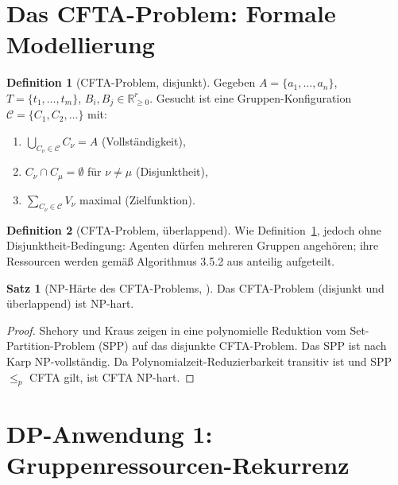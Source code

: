 \documentclass[a4paper,12pt]{article}
\theoremstyle{definition}
\newtheorem{definition}{Definition}
\newtheorem{satz}{Satz}
\begin{document}
\section{Das CFTA-Problem: Formale Modellierung}

\begin{definition}[CFTA-Problem, disjunkt]
    \label{def:cfta_disj}
    Gegeben $A = \{a_1, \ldots, a_n\}$, $T = \{t_1, \ldots, t_m\}$,
    $B_i, B_j \in \mathbb{R}_{\geq 0}^r$.
    Gesucht ist eine Gruppen-Konfiguration
    $\mathcal{C} = \{C_1, C_2, \ldots\}$ mit:
    \begin{enumerate}
        \item $\bigcup_{C_\nu \in \mathcal{C}} C_\nu = A$ (Vollst\"{a}ndigkeit),
        \item $C_\nu \cap C_\mu = \emptyset$ f\"{u}r $\nu \neq \mu$ (Disjunktheit),
        \item $\sum_{C_\nu \in \mathcal{C}} V_\nu$ maximal (Zielfunktion).
    \end{enumerate}
\end{definition}

\begin{definition}[CFTA-Problem, \"{u}berlappend]
    \label{def:cfta_overlap}
    Wie Definition~\ref{def:cfta_disj}, jedoch ohne Disjunktheit-Bedingung:
    Agenten d\"{u}rfen mehreren Gruppen angeh\"{o}ren; ihre Ressourcen werden
    gem\"{a}{\ss} Algorithmus 3.5.2 aus \cite{sk98} anteilig aufgeteilt.
\end{definition}

\begin{satz}[NP-H\"{a}rte des CFTA-Problems, \cite{sk95}]
    Das CFTA-Problem (disjunkt und \"{u}berlappend) ist NP-hart.
\end{satz}

\begin{proof}
    Shehory und Kraus zeigen in \cite{sk95} eine polynomielle Reduktion
    vom Set-Partition-Problem (SPP) auf das disjunkte CFTA-Problem.
    Das SPP ist nach Karp \cite{karp72} NP-vollst\"{a}ndig.
    Da Polynomialzeit-Reduzierbarkeit transitiv ist und SPP $\leq_p$ CFTA gilt,
    ist CFTA NP-hart. \qedhere
\end{proof}

\section{DP-Anwendung 1: Gruppenressourcen-Rekurrenz}
\end{document}
